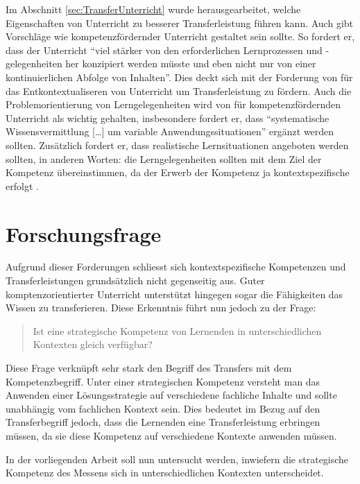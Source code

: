 Im Abschnitt \ref{sec:TransferUnterricht} wurde herausgearbeitet, welche Eigenschaften von Unterricht zu besserer Transferleistung führen kann. Auch \citet{Lersch2007} gibt Vorschläge wie kompetenzfördernder Unterricht gestaltet sein sollte. So fordert er, dass der Unterricht "`viel stärker von den erforderlichen Lernprozessen und -gelegenheiten her konzipiert werden müsste und eben nicht nur von einer kontinuierlichen Abfolge von Inhalten"'. Dies deckt sich mit der Forderung von \citet{Mietzel2007} für das Entkontextualiseren von Unterricht um Transferleistung zu fördern. Auch die Problemorientierung von Lerngelegenheiten wird von \citet{Lersch2007} für kompetenzfördernden Unterricht als wichtig gehalten, insbesondere fordert er, dass "`systematische Wissensvermittlung […] um variable Anwendungssituationen"' ergänzt werden sollten. Zusätzlich fordert er, dass realistische Lernsituationen angeboten werden sollten, in anderen Worten: die Lerngelegenheiten sollten mit dem Ziel der Kompetenz übereinstimmen, da der Erwerb der Kompetenz ja kontextspezifische erfolgt \citep{Klieme2004}.


\section{Forschungsfrage}
Aufgrund dieser Forderungen schliesst sich kontextspezifische Kompetenzen und Transferleistungen grundsätzlich nicht gegenseitig aus. Guter komptenzorientierter Unterricht unterstützt hingegen sogar die Fähigkeiten das Wissen zu transferieren. Diese Erkenntnis führt nun jedoch zu der Frage: 
\begin{quote}
Ist eine strategische Kompetenz von Lernenden in unterschiedlichen Kontexten gleich verfügbar?
\end{quote}

Diese Frage verknüpft sehr stark den Begriff des Transfers mit dem Kompetenzbegriff. Unter einer strategischen Kompetenz versteht man das Anwenden einer Lösungsstrategie auf verschiedene fachliche Inhalte und sollte unabhängig vom fachlichen Kontext sein. Dies bedeutet im Bezug auf den Transferbegriff jedoch, dass die Lernenden eine Transferleistung erbringen müssen, da sie diese Kompetenz auf verschiedene Kontexte anwenden müssen. 

In der vorliegenden Arbeit soll nun untersucht werden, inwiefern die strategische Kompetenz des Messens sich in unterschiedlichen Kontexten unterscheidet.

